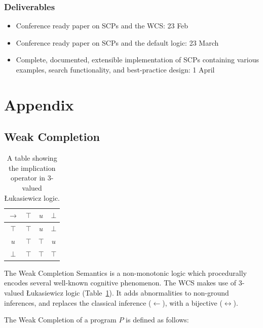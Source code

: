 \documentclass{article}
\begin{document}
\subsubsection*{Deliverables}
\begin{itemize}
\item Conference ready paper on SCPs and the WCS: 23 Feb
\item Conference ready paper on SCPs and the default logic: 23 March
\item Complete, documented, extensible implementation of SCPs containing various examples, search functionality, and best-practice design: 1 April
\end{itemize}
	



\newpage

\section{Appendix}
\subsection{Weak Completion} \label{ssec:weakcompletion}

\begin{table}
\begin{center}


\begin{tabular}{ c | c c c }
  $\rightarrow$& $\top$ & $u$ & $\bot$ \\ \hline
 $\top$ & $\top$ & $u$ & $\bot$ \\  
 $u$ & $\top$ & $\top$ & $u$\\  
 $\bot$ & $\top$ & $\top$ & $\top$
\end{tabular}
\caption{A table showing the implication operator in 3-valued \L ukasiewicz logic.}
\label{tbl:luk}

\end{center}
\end{table}

The Weak Completion Semantics is a non-monotonic logic which procedurally encodes several well-known cognitive phenomenon. The WCS makes use of 3-valued \L ukasiewicz logic (Table~\ref{tbl:luk}). It adds abnormalities to non-ground inferences, and replaces the classical inference ($\leftarrow$), with a bijective ($\leftrightarrow$). 

The Weak Completion of a program $P$ is defined as follows:
\end{document}

